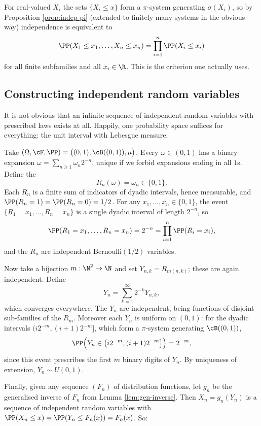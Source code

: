 For real-valued $X_i$ the sets $\{X_i \leq x\}$ form a $\pi$-system generating $\sigma(X_i)$, so by Proposition \ref{prop:indep-pi} (extended to finitely many systems in the obvious way) independence is equivalent to
$$
\PP(X_1 \leq x_1, \dots, X_n \leq x_n) = \prod_{i=1}^n \PP(X_i \leq x_i)
$$
for all finite subfamilies and all $x_i \in \R$. This is the criterion one actually uses.

\subsection{Constructing independent random variables}

It is not obvious that an infinite sequence of independent random variables with prescribed laws exists at all. Happily, one probability space suffices for everything: the unit interval with Lebesgue measure.

Take $(\Omega, \cF, \PP) = \big((0,1), \cB((0,1)), \mu\big)$. Every $\omega \in (0,1)$ has a binary expansion $\omega = \sum_{n\geq 1} \omega_n 2^{-n}$, unique if we forbid expansions ending in all $1$s. Define the 
$$
R_n(\omega) = \omega_n \in \{0,1\}.
$$
Each $R_n$ is a finite sum of indicators of dyadic intervals, hence measurable, and $\PP(R_n = 1) = \PP(R_n = 0) = 1/2$. For any $x_1,\dots,x_n \in \{0,1\}$, the event $\{R_1 = x_1,\dots,R_n = x_n\}$ is a single dyadic interval of length $2^{-n}$, so
$$
\PP(R_1 = x_1, \dots, R_n = x_n) = 2^{-n} = \prod_{i=1}^n \PP(R_i = x_i),
$$
and the $R_n$ are independent Bernoulli$(1/2)$ variables.

Now take a bijection $m : \N^2 \to \N$ and set $Y_{n,k} = R_{m(n,k)}$; these are again independent. Define
$$
Y_n = \sum_{k=1}^\infty 2^{-k} Y_{n,k},
$$
which converges everywhere. The $Y_n$ are independent, being functions of disjoint sub-families of the $R_m$. Moreover each $Y_n$ is uniform on $(0,1)$: for the dyadic intervals $\big(i2^{-m}, (i+1)2^{-m}\big]$, which form a $\pi$-system generating $\cB((0,1))$,
$$
\PP\Big( Y_n \in \big(i2^{-m}, (i+1)2^{-m}\big] \Big) = 2^{-m},
$$
since this event prescribes the first $m$ binary digits of $Y_n$. By uniqueness of extension, $Y_n \sim U(0,1)$.

Finally, given any sequence $(F_n)$ of distribution functions, let $g_n$ be the generalised inverse of $F_n$ from Lemma \ref{lem:gen-inverse}. Then $X_n = g_n(Y_n)$ is a sequence of independent random variables with $\PP(X_n \leq x) = \PP(Y_n \leq F_n(x)) = F_n(x)$. So:

